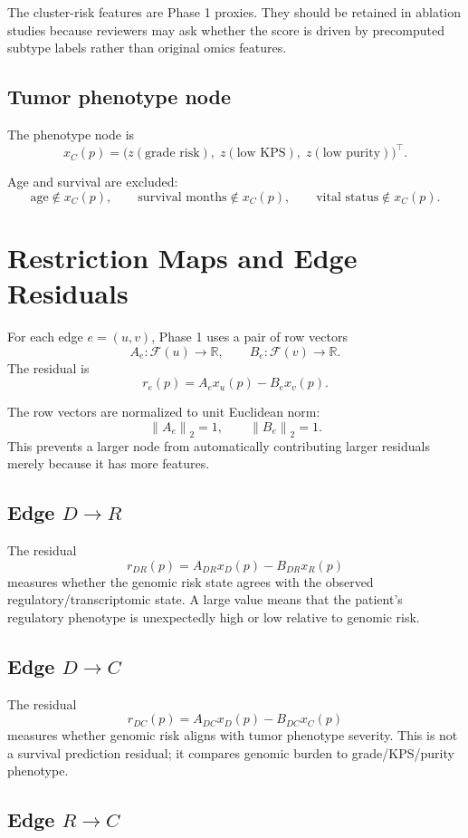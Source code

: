 \documentclass[11pt]{article}
\newcommand{\R}{\mathbb{R}}
\newcommand{\F}{\mathcal{F}}
\newcommand{\norm}[1]{\left\lVert #1 \right\rVert}
\begin{document}
The cluster-risk features are Phase 1 proxies.  They should be retained in ablation studies because reviewers may ask whether the score is driven by precomputed subtype labels rather than original omics features.

\subsection{Tumor phenotype node}

The phenotype node is
\[
x_C(p)=\big(z(\text{grade risk}),\;z(\text{low KPS}),\;z(\text{low purity})\big)^\top.
\]

Age and survival are excluded:
\[
\text{age}\notin x_C(p),
\qquad
\text{survival months}\notin x_C(p),
\qquad
\text{vital status}\notin x_C(p).
\]

\section{Restriction Maps and Edge Residuals}

For each edge $e=(u,v)$, Phase 1 uses a pair of row vectors
\[
A_e:\F(u)\to\R,
\qquad
B_e:\F(v)\to\R.
\]
The residual is
\[
r_e(p)=A_e x_u(p)-B_e x_v(p).
\]

The row vectors are normalized to unit Euclidean norm:
\[
\norm{A_e}_2=1,
\qquad
\norm{B_e}_2=1.
\]
This prevents a larger node from automatically contributing larger residuals merely because it has more features.

\subsection{Edge $D\to R$}

The residual
\[
r_{DR}(p)=A_{DR}x_D(p)-B_{DR}x_R(p)
\]
measures whether the genomic risk state agrees with the observed regulatory/transcriptomic state.  A large value means that the patient's regulatory phenotype is unexpectedly high or low relative to genomic risk.

\subsection{Edge $D\to C$}

The residual
\[
r_{DC}(p)=A_{DC}x_D(p)-B_{DC}x_C(p)
\]
measures whether genomic risk aligns with tumor phenotype severity.  This is not a survival prediction residual; it compares genomic burden to grade/KPS/purity phenotype.

\subsection{Edge $R\to C$}
\end{document}
